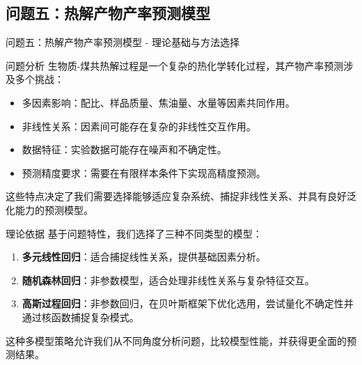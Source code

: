 \documentclass{beamer}
\begin{document}
\subsection{问题五：热解产物产率预测模型}
\begin{frame}{问题五：热解产物产率预测模型 - 理论基础与方法选择}
    \scriptsize
    \begin{block}{问题分析}
        生物质-煤共热解过程是一个复杂的热化学转化过程，其产物产率预测涉及多个挑战：
        \begin{itemize}
            \item 多因素影响：配比、样品质量、焦油量、水量等因素共同作用。
            \item 非线性关系：因素间可能存在复杂的非线性交互作用。
            \item 数据特征：实验数据可能存在噪声和不确定性。
            \item 预测精度要求：需要在有限样本条件下实现高精度预测。
        \end{itemize}
        这些特点决定了我们需要选择能够适应复杂系统、捕捉非线性关系、并具有良好泛化能力的预测模型。
    \end{block}
    \begin{block}{理论依据}
        基于问题特性，我们选择了三种不同类型的模型：
        \begin{enumerate}
            \item \textbf{多元线性回归}：适合捕捉线性关系，提供基础因素分析。
            \item \textbf{随机森林回归}：非参数模型，适合处理非线性关系与复杂特征交互。
            \item \textbf{高斯过程回归}：非参数回归，在贝叶斯框架下优化选用，尝试量化不确定性并通过核函数捕捉复杂模式。
        \end{enumerate}
        这种多模型策略允许我们从不同角度分析问题，比较模型性能，并获得更全面的预测结果。
    \end{block}
\end{frame}
\end{document}

